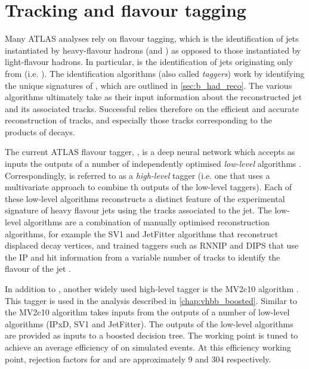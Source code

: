 \chapter{Tracking and flavour tagging}\label{chap:tracking}

Many ATLAS analyses rely on flavour tagging, which is the identification of jets instantiated by heavy-flavour hadrons (\bhadrons and \chadrons) as opposed to those instantiated by light-flavour hadrons.
In particular, \btagging is the identification of jets originating only from \bhadrons (i.e. \bjets).
The \bjet identification algorithms (also called \textit{taggers}) work by identifying the unique signatures of \bjets, which are outlined in \cref{sec:b_had_reco}.
The various \btagging algorithms ultimately take as their input information about the reconstructed jet and its associated tracks.
Successful \btagging relies therefore on the efficient and accurate reconstruction of tracks, and especially those tracks corresponding to the products of \bhadron decays.


The current ATLAS flavour tagger, \DLr \cite{ATL-PHYS-PUB-2017-013}, is a deep neural network which accepts as inputs the outputs of a number of independently optimised \textit{low-level} algorithms \cite{FTAG-2018-01}.
Correspondingly, \DLr is referred to as a \textit{high-level} tagger (i.e. one that uses a multivariate approach to combine th outputs of the low-level taggers).
Each of these low-level algorithms reconstructs a distinct feature of the experimental signature of heavy flavour jets using the tracks associated to the jet.
The low-level algorithms are a combination of manually optimised reconstruction algorithms, for example the SV1 and JetFitter algorithms that reconstruct displaced decay vertices, and trained taggers such as RNNIP and DIPS that use the IP and hit information from a variable number of tracks to identify the flavour of the jet \cite{FTAG-2018-01,ATL-PHYS-PUB-2017-011,ATL-PHYS-PUB-2017-003,ATL-PHYS-PUB-2020-014}.

In addition to \DLr, another widely used high-level tagger is the MV2c10 algorithm \cite{ATL-PHYS-PUB-2015-022,FTAG-2018-01,ATL-PHYS-PUB-2017-013}.
This tagger is used in the analysis described in \cref{chap:vhbb_boosted}.
Similar to \DLr the MV2c10 algorithm takes inputs from the outputs of a number of low-level algorithms (IPxD, SV1 and JetFitter).
The outputs of the low-level algorithms are provided as inputs to a boosted decision tree.
The working point is tuned to achieve an average \bjet efficiency of  on simulated \ttbar events.
At this efficiency working point, rejection factors for \cjets and \ljets are approximately 9 and 304 respectively.

